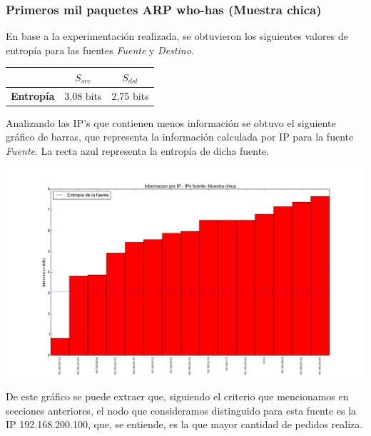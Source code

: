 \subsubsection{Primeros mil paquetes ARP who-has (Muestra chica)}

\indent \indent En base a la experimentación realizada, se obtuvieron los siguientes valores de entropía para las fuentes \textit{Fuente} y \textit{Destino}.\\

\begin{center}
	\begin{tabular}{ | c | c | c |} \hline
	   & \textbf{$S_{src}$} & \textbf{$S_{dst}$} \\ \hline
	  	\textbf{Entropía} & 3,08 bits & 2,75 bits\\ \hline
	\end{tabular}
\end{center}

\indent \indent Analizando las IP's que contienen menos información se obtuvo el siguiente gráfico de barras, que representa la información calculada por IP para la fuente \textit{Fuente}. La recta azul representa la entropía de dicha fuente.\\

\begin{center}
\includegraphics[scale=0.5,clip=true,trim=100 0 0 0]{graphics/laburo_chica_src.png}
\end{center}
\indent De este gráfico se puede extraer que, siguiendo el criterio que mencionamos en secciones anteriores, el nodo que consideramos distinguido para esta fuente es la IP 192.168.200.100, que, se entiende, es la que mayor cantidad de pedidos realiza.


